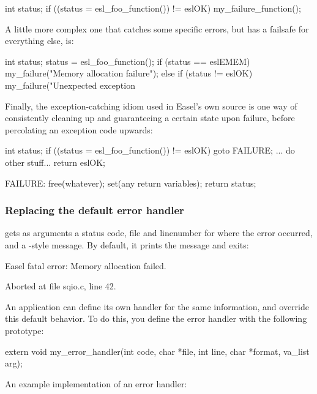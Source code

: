 \begin{cchunk}
     int status;
     if ((status = esl_foo_function()) != eslOK)  my_failure_function();
\end{cchunk}

A little more complex one that catches some specific errors, but has a
failsafe for everything else, is:

\begin{cchunk}
     int status;
     status = esl_foo_function();
     if      (status == eslEMEM) my_failure("Memory allocation failure");
     else if (status != eslOK)   my_failure("Unexpected exception %
\end{cchunk}

Finally, the exception-catching idiom used in Easel's own source is
one way of consistently cleaning up and guaranteeing a certain state
upon failure, before percolating an exception code upwards:

\begin{cchunk}
     int status;
     if ((status = esl_foo_function()) != eslOK)  goto FAILURE;
     ... do other stuff...
     return eslOK;

  FAILURE:
     free(whatever);
     set(any return variables);
     return status;
\end{cchunk}


\subsubsection{Replacing the default error handler}

 gets as arguments a status code, file and
linenumber for where the error occurred, and a -style
message. By default, it prints the message and exits:

\begin{cchunk}
Easel fatal error:
Memory allocation failed.

Aborted at file sqio.c, line 42. 
\end{cchunk}

An application can define its own handler for the same information,
and override this default behavior. To do this, you define the error
handler with the following prototype:

\begin{cchunk}
extern void my_error_handler(int code, char *file, int line, char *format, va_list arg);
\end{cchunk}

An example implementation of an error handler:

